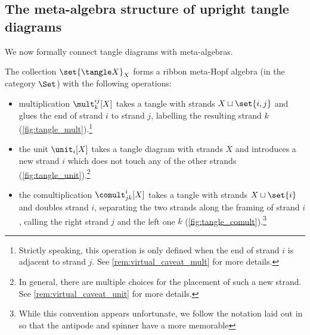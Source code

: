 \subsection{The meta-algebra structure of upright tangle diagrams}

We now formally connect tangle diagrams with meta-algebras.

\begin{theorem}
        \label{thm:tangles_meta_algebra}
        The collection $\set{\tangle X}_X$ forms a ribbon meta-Hopf algebra (in
        the category $\Set$) with the following operations:
        \begin{itemize}
                \item multiplication $\mult^{ij}_{k}[X]$ takes a tangle with
                        strands $X\sqcup\set{i,j}$ and glues the end of strand
                        $i$ to strand $j$, labelling the resulting strand
                        $k$ (\cref{fig:tangle_mult}).\footnote{Strictly
                                speaking, this operation is only defined when
                                the end of strand $i$ is adjacent to strand $j$.
                                See \cref{rem:virtual_caveat_mult} for more
                                details.%
                        }
                \item the unit $\unit_{i}[X]$ takes a tangle diagram with
                        strands $X$ and introduces a new strand $i$ which does
                        not touch any of the other strands
                        (\cref{fig:tangle_unit}).\footnote{In general, there are
                                multiple choices for the placement of such a new
                                strand. See \cref{rem:virtual_caveat_unit} for
                                more
                                details.%
                        }
                \item the comultiplication $\comult^{i}_{jk}[X]$ takes a tangle
                        with strands $X\sqcup \set{i}$ and doubles strand $i$,
                        separating the two strands along the framing of strand
                        $i$, calling the right strand $j$ and the left one
                        $k$ (\cref{fig:tangle_comult}).\footnote{While this
                                convention appears unfortunate, we follow the
                                notation laid out in \cite{BV} so that the
                                antipode and spinner have a more memorable
}
\end{itemize}
\end{theorem}
